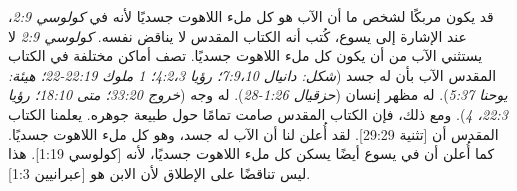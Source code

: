 قد يكون مربكًا لشخص ما أن الآب هو كل ملء اللاهوت جسديًا لأنه في \textit{كولوسي 2:9}، عند الإشارة إلى يسوع، كُتب أنه  الكتاب المقدس لا يناقض نفسه. \textit{كولوسي 2:9} لا يستثني الآب من أن يكون كل ملء اللاهوت جسديًا. تصف أماكن مختلفة في الكتاب المقدس الآب بأن له جسد (\textit{شكل: دانيال 7:9،10؛ رؤيا 4:2،3؛ 1 ملوك 22:19-22؛ هيئة: يوحنا 5:37}). له مظهر إنسان (\textit{حزقيال 1:26-28}). له وجه (\textit{خروج 33:20؛ متى 18:10؛ رؤيا 22:3، 4}). ومع ذلك، فإن الكتاب المقدس صامت تمامًا حول طبيعة جوهره. يعلمنا الكتاب المقدس أن [تثنية 29:29]. لقد أُعلن لنا أن الآب له جسد، وهو كل ملء اللاهوت جسديًا. كما أُعلن أن في يسوع أيضًا يسكن كل ملء اللاهوت جسديًا، لأنه [كولوسي 1:19]. هذا ليس تناقضًا على الإطلاق لأن الابن هو [عبرانيين 1:3].


